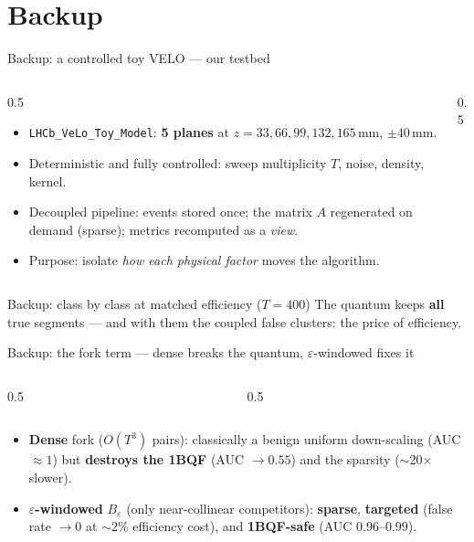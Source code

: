 \section*{Backup}
\begin{frame}{Backup: a controlled toy VELO --- our testbed}
  \begin{columns}[T]
    \begin{column}{0.5\textwidth}
      \begin{itemize}
        \item \texttt{LHCb\_VeLo\_Toy\_Model}: \textbf{5 planes} at $z{=}33,66,99,132,165$\,mm, $\pm40$\,mm.
        \item Deterministic and fully controlled: sweep multiplicity $T$, noise, density, kernel.
        \item Decoupled pipeline: events stored once; the matrix $A$ regenerated on demand (sparse); metrics recomputed as a \emph{view}.
        \item Purpose: isolate \emph{how each physical factor} moves the algorithm.
      \end{itemize}
    \end{column}
    \begin{column}{0.5\textwidth}
      \centering{}
    \end{column}
  \end{columns}
\end{frame}

\begin{frame}{Backup: class by class at matched efficiency ($T{=}400$)}
  \centering{}
  \vspace{-2pt}
  {\footnotesize The quantum keeps \textbf{all} true segments --- and with them the coupled false clusters: the price of efficiency.}
\end{frame}

\begin{frame}{Backup: the fork term --- dense breaks the quantum, $\varepsilon$-windowed fixes it}
  \begin{columns}[T]
    \begin{column}{0.5\textwidth}
      \centering{}
    \end{column}
    \begin{column}{0.5\textwidth}
      \centering{}
    \end{column}
  \end{columns}
  \begin{itemize}
    \item \textbf{Dense} fork ($O(T^3)$ pairs): classically a benign uniform down-scaling (AUC $\approx1$) but \textbf{destroys the 1BQF} (AUC $\to0.55$) and the sparsity ($\sim$20$\times$ slower).
    \item \textbf{$\varepsilon$-windowed} $B_\varepsilon$ (only near-collinear competitors): \textbf{sparse}, \textbf{targeted} (false rate $\to0$ at $\sim$2\% efficiency cost), and \textbf{1BQF-safe} (AUC $0.96$--$0.99$).
  \end{itemize}
\end{frame}

